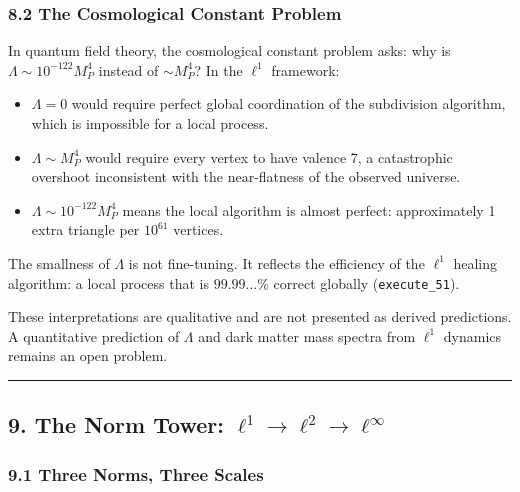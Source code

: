 \documentclass[
]{article}
\providecommand{\tightlist}{%
  \setlength{\itemsep}{0pt}\setlength{\parskip}{0pt}}
\begin{document}
\subsubsection{8.2 The Cosmological Constant
Problem}\label{the-cosmological-constant-problem}

In quantum field theory, the cosmological constant problem asks: why is
\(\Lambda \sim 10^{-122} M_P^4\) instead of \(\sim M_P^4\)? In the
\(\ell^1\) framework:

\begin{itemize}
\tightlist
\item
  \(\Lambda = 0\) would require perfect global coordination of the
  subdivision algorithm, which is impossible for a local process.
\item
  \(\Lambda \sim M_P^4\) would require every vertex to have valence 7, a
  catastrophic overshoot inconsistent with the near-flatness of the
  observed universe.
\item
  \(\Lambda \sim 10^{-122} M_P^4\) means the local algorithm is almost
  perfect: approximately 1 extra triangle per \(10^{61}\) vertices.
\end{itemize}

The smallness of \(\Lambda\) is not fine-tuning. It reflects the
efficiency of the \(\ell^1\) healing algorithm: a local process that is
\(99.99\ldots\%\) correct globally (\texttt{execute\_51}).

These interpretations are qualitative and are not presented as derived
predictions. A quantitative prediction of \(\Lambda\) and dark matter
mass spectra from \(\ell^1\) dynamics remains an open problem.

\begin{center}\rule{0.5\linewidth}{0.5pt}\end{center}

\subsection{\texorpdfstring{9. The Norm Tower:
\(\ell^1 \to \ell^2 \to \ell^\infty\)}{9. The Norm Tower: \textbackslash ell\^{}1 \textbackslash to \textbackslash ell\^{}2 \textbackslash to \textbackslash ell\^{}\textbackslash infty}}\label{the-norm-tower-ell1-to-ell2-to-ellinfty}

\subsubsection{9.1 Three Norms, Three
Scales}\label{three-norms-three-scales}
\end{document}
